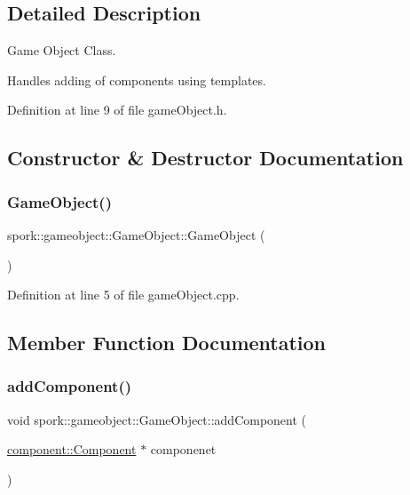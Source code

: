 \subsection{Detailed Description}
Game Object Class. 

Handles adding of components using templates. 

Definition at line 9 of file game\+Object.\+h.



\subsection{Constructor \& Destructor Documentation}
\mbox{\label{classspork_1_1gameobject_1_1_game_object_a4bbe45cdb98e6052d8ba2a9b39abdef2}} 
\subsubsection{\texorpdfstring{Game\+Object()}{GameObject()}}
{\footnotesize\ttfamily spork\+::gameobject\+::\+Game\+Object\+::\+Game\+Object (\begin{DoxyParamCaption}{ }\end{DoxyParamCaption})}



Definition at line 5 of file game\+Object.\+cpp.



\subsection{Member Function Documentation}
\mbox{\label{classspork_1_1gameobject_1_1_game_object_a92c7417aee20ea020fd007f7c388afa7}} 
\subsubsection{\texorpdfstring{add\+Component()}{addComponent()}}
{\footnotesize\ttfamily void spork\+::gameobject\+::\+Game\+Object\+::add\+Component (\begin{DoxyParamCaption}\item[{\hyperlink{classspork_1_1gameobject_1_1component_1_1_component}{component\+::\+Component} $\ast$}]{componenet }\end{DoxyParamCaption})}



